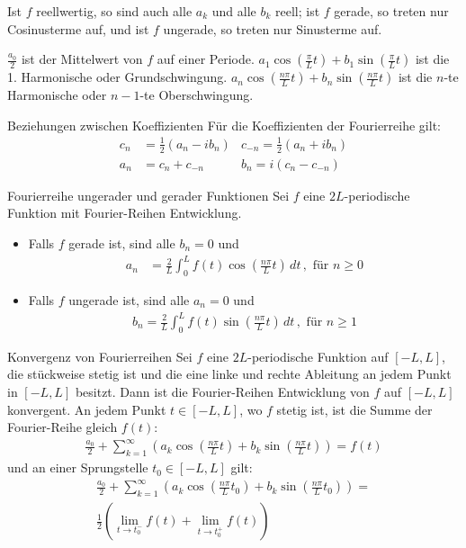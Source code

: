 \documentclass[a4paper,10pt]{article}
\begin{document}
Ist $f$ reellwertig, so sind auch alle $a_k$ und alle $b_k$ reell; ist $f$ gerade, so treten nur Cosinusterme auf, und ist $f$ ungerade, so treten nur Sinusterme auf.

$\frac{a_0}{2}$ ist der Mittelwert von $f$ auf einer Periode. $a_1\cos\left(\frac{\pi}{L}t\right)+b_1\sin\left(\frac{\pi}{L}t\right)$ ist die 1. Harmonische oder Grundschwingung. $a_n\cos\left(\frac{n\pi}{L}t\right)+b_n\sin\left(\frac{n\pi}{L}t\right)$ ist die $n$-te Harmonische oder $n-1$-te Oberschwingung.

\begin{mainbox}{Beziehungen zwischen Koeffizienten}
  Für die Koeffizienten der Fourierreihe gilt:
  \begin{align*} 
    c_n&=\frac{1}{2}(a_n- i b_n) & c_{-n} =\frac{1}{2}(a_n+ i b_n)\\ 
    a_n&=c_n+c_{-n} & b_n = i(c_n-c_{-n})  \end{align*}
\end{mainbox}

\begin{subbox}{Fourierreihe ungerader und gerader Funktionen}
  Sei \(f\) eine \(2L\)-periodische Funktion mit Fourier-Reihen Entwicklung.
  \begin{itemize}
    \item{
      Falls \(f\) gerade ist, sind alle \(b_n=0\) und \begin{align*} a_n&=\frac{2}{L}\int_0^Lf(t)\cos\left(\frac{n\pi}{L}t\right)\,dt\,,\text{ für }n\geq0 \end{align*}
    }
    \item{
      Falls \(f\) ungerade ist, sind alle \(a_n=0\) und \begin{align*} b_n=\frac{2}{L}\int_0^Lf(t)\sin\left(\frac{n\pi}{L}t\right)\,dt\,,\text{ für }n\geq1 \end{align*}
    }
  \end{itemize}
\end{subbox}

\begin{subbox}{Konvergenz von Fourierreihen}
  Sei \(f\) eine \(2L\)-periodische Funktion auf \([-L,L]\), die stückweise stetig ist und die eine linke und rechte Ableitung an jedem Punkt in \([-L,L]\) besitzt. Dann ist die Fourier-Reihen Entwicklung von \(f\) auf \([-L,L]\) konvergent. An jedem Punkt \(t\in[-L,L]\), wo \(f\) stetig ist, ist die Summe der Fourier-Reihe gleich \(f(t)\):
   \begin{align*} \frac{a_0}{2}+\sum_{k=1}^\infty\left(a_k\cos\left(\frac{n\pi}{L}t\right)+b_k\sin\left(\frac{n\pi}{L}t\right)\right)=f(t) \end{align*}
    und an einer Sprungstelle \(t_0\in[-L,L]\) gilt:
     \begin{align*} \frac{a_0}{2}+\sum_{k=1}^\infty\left(a_k\cos\left(\frac{n\pi}{L}t_0\right)+b_k\sin\left(\frac{n\pi}{L}t_0\right)\right)=\\\frac12\left(\lim_{t\to t_0^-}f(t)+\lim_{t\to t_0^+}f(t)\right) \end{align*}
\end{subbox}
\end{document}
